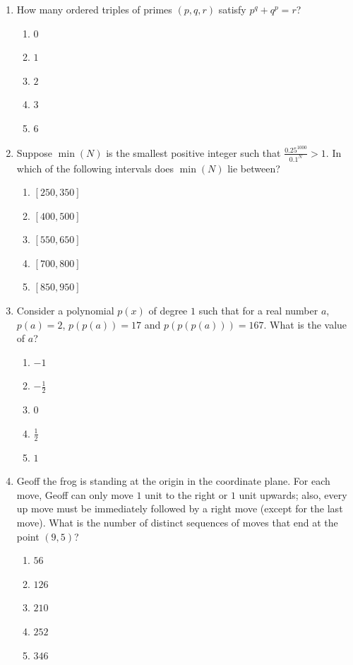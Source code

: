 \documentclass[12pt]{scrartcl}
\begin{document}
\begin{enumerate}
\item How many ordered triples of primes $(p,q,r)$ satisfy $p^{q}+q^{p}=r$?
\begin{enumerate}
    \item $0$
    \item $1$
    \item $2$
    \item $3$
    \item $6$
\end{enumerate}

\item Suppose $\min(N)$ is the smallest positive integer such that $\frac{0.25^{1000}}{0.1^{N}}>1$. In which of the following intervals does $\min(N)$ lie between?
\begin{enumerate}
    \item $[250, 350]$
    \item $[400, 500]$
    \item $[550, 650]$
    \item $[700, 800]$
    \item $[850, 950]$
\end{enumerate}

\item Consider a polynomial $p(x)$ of degree $1$ such that for a real number $a$, $p(a)=2$, $p(p(a))=17$ and $p(p(p(a)))=167$. What is the value of $a$?
\begin{enumerate}
    \item $-1$
    \item $-\frac{1}{2}$
    \item $0$
    \item $\frac{1}{2}$
    \item $1$
\end{enumerate}

\item Geoff the frog is standing at the origin in the coordinate plane. For each move, Geoff can only move $1$ unit to the right or $1$ unit upwards; also, every up move must be immediately followed by a right move (except for the last move). What is the number of distinct sequences of moves that end at the point $(9,5)$?
\begin{enumerate}
    \item $56$
    \item $126$
    \item $210$
    \item $252$
    \item $346$
\end{enumerate}


\end{enumerate}
\end{document}
